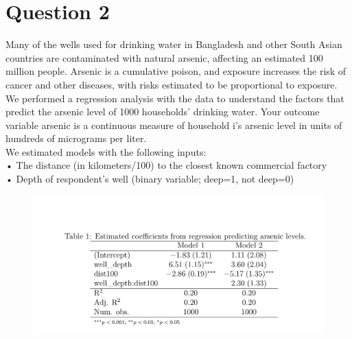 \documentclass[12pt,letterpaper]{article}
\begin{document}
	\section*{Question 2}
	\vspace{.25cm}
	\noindent 	Many of the wells used for drinking water in Bangladesh and other South Asian countries are contaminated with natural arsenic, affecting an estimated 100 million people. Arsenic is a cumulative poison, and exposure increases the risk of cancer and other diseases, with risks
	estimated to be proportional to exposure.\\
	We performed a regression analysis with the data to understand the factors that predict the arsenic level of 1000 households’ drinking water. Your outcome variable arsenic is a continuous measure of household i’s arsenic level in units of hundreds of micrograms per liter.\\
	We estimated models with the following inputs:\\
	• The distance (in kilometers/100) to the closest known commercial factory\\
	• Depth of respondent’s well (binary variable; deep=1, not deep=0)
\begin{figure}
\centering
\includegraphics[width=0.7\linewidth]{Q2}
\caption{}
\label{fig:q2}
\end{figure}


	
	
	\vspace{.5cm}
	
\end{document}
